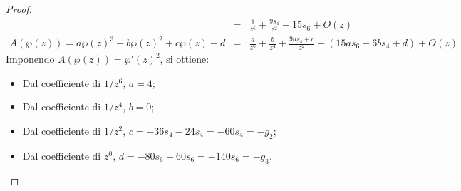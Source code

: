 \begin{proof}
\begin{eqnarray*}
          & = & \frac{1}{z^6} + \frac{9s_4}{z^2} + 15s_6 + O(z) \\
A(\wp(z)) = a\wp(z)^3+b\wp(z)^2 + c\wp(z)+d & = & \frac{a}{z^6} + \frac{b}{z^4} + \frac{9as_4+c}{z^2} + (15as_6+6bs_4+d) + O(z)
\end{eqnarray*}
Imponendo $A(\wp(z))=\wp'(z)^2$, si ottiene:
\begin{itemize}
\item Dal coefficiente di $1/z^6$, $a=4$;
\item Dal coefficiente di $1/z^4$, $b=0$;
\item Dal coefficiente di $1/z^2$, $c = -36s_4-24s_4 = -60s_4 = -g_2$;
\item Dal coefficiente di $z^0$, $d=-80s_6-60s_6 = -140s_6 = -g_3$.
\end{itemize}
\end{proof}
